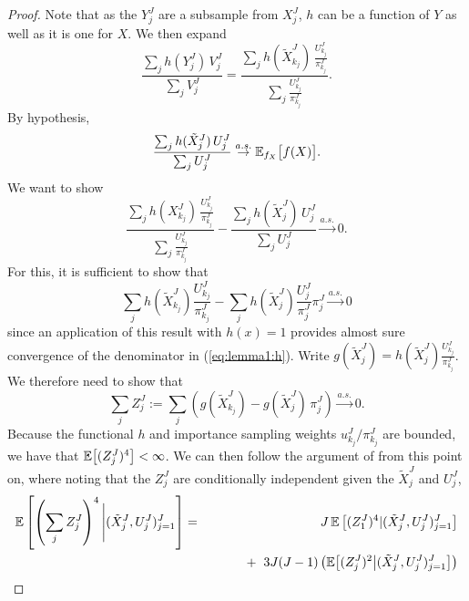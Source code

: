 \begin{proof}
    Note that as the $Y_j^J$ are a subsample from $X_j^J$, $h$ can be a function of $Y$ as well as it is one for $X$. We then expand
    \begin{equation}\frac{\sum_j h(Y_j^J) \, V_j^J}{\sum_j V_j^J} = \frac{\sum_j h(\tilde X_{k_j}^J)\, \frac{U_{k_j}^J}{\pi_{k_j}^J}}{\sum_j \frac{U_{k_j}^J}{\pi_{k_j}^J}}.\end{equation}
    By hypothesis,
    \begin{equation}
    \frac{\sum_j h(\tilde X_j^J)\, U_j^J}{\sum_j U_j^J} \stackrel{a.s.}{\to} \mathbb{E}_{f_X}\big[f(X)\big].
    \end{equation}
    We want to show
    \begin{equation}\label{eq:lemma1:h}
    \frac{\sum_j h(X_{k_j}^J)\, \frac{U_{k_j}^J}{\pi_{k_j}^J}}{\sum_j \frac{U_{k_j}^J}{\pi_{k_j}^J}} - \frac{\sum_j h(\tilde X_j^J)\, U_j^J}{\sum_j U_j^J} \stackrel{a.s.}{\to} 0.
    \end{equation}
    For this, it is sufficient to show that
   \begin{equation} 
   \sum_j h(\tilde X_{k_j}^J)\frac{U_{k_j}^J}{\pi_{k_j}^J}
    -  \sum_j h(\tilde X_j^J)\frac{U_j^J}{\pi_j^J}\pi_j^J \stackrel{a.s.}{\to} 0 
    \end{equation}
    since an application of this result with $h(x)=1$ provides almost sure convergence of the denominator in (\ref{eq:lemma1:h}).
    Write $g(\tilde X_j^J) = h(\tilde X_j^J)\frac{U_{k_j}^J}{\pi_{k_j}^J}$. We therefore need to show that 
    \begin{equation}
    \sum_j Z_j^J := \sum_j \left(g(\tilde X_{k_j}^J) -  g(\tilde X_j^J) \, \pi_j^J \right) \stackrel{a.s.}{\to} 0.
\end{equation}
    Because the functional $h$ and importance sampling weights $u_{k_j}^J/\pi_{k_j}^J$ are bounded, we have that $\mathbb{E}\big[(Z_j^J)^4\big] < \infty$. We can then follow the argument of \cite{chopin20} from this point on, where noting that the $Z_j^J$ are conditionally independent given the $\tilde{X}_j^J$ and $U_j^J$,
    \begin{eqnarray} 
    \E\left[\left(\sum_j Z_j^J\right)^4 \Bigg| (\tilde X_j^J,U_j^J)_{j=1}^J \right] 
    &=& J\, \E\left[(Z_1^J)^4|(\tilde X_j^J,U_j^J)_{j=1}^J\right] 
    \nonumber
    \\
    && \hspace{10mm}+ \hspace{2mm} 3J(J-1)\left(\E\big[(Z_j^J)^2\big|(\tilde X_j^J,U_j^J)_{j=1}^J\big]\right) 
    \\ 

\end{eqnarray}
\end{proof}
